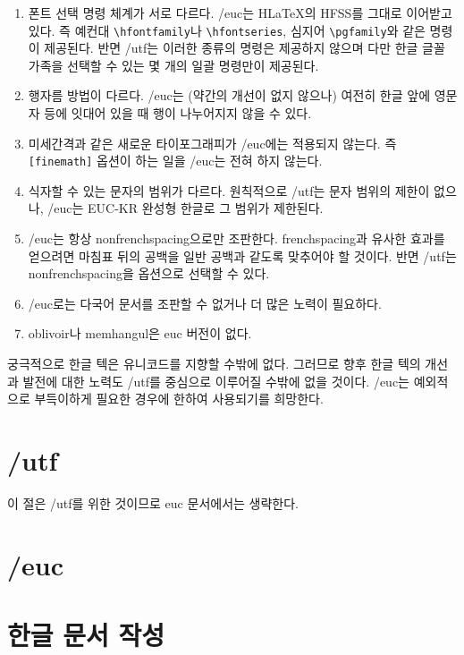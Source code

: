 \begin{enumerate}
\item 폰트 선택 명령 체계가 서로 다르다. \kotex/euc는 H\LaTeX 의
HFSS를 그대로 이어받고 있다. 즉 예컨대 \verb|\hfontfamily|나
\verb|\hfontseries|, 심지어 \verb|\pgfamily|와 같은 명령이
제공된다. 반면 \kotex/utf는 이러한 종류의 명령은 제공하지 않으며
다만 한글 글꼴 가족을 선택할 수 있는 몇 개의 일괄 명령만이 제공된다.

\item 행자름 방법이 다르다. \kotex/euc는 (약간의 개선이 없지 않으나)
여전히 한글 앞에 영문자 등에 잇대어 있을 때 행이 나누어지지 않을 수 있다.

\item 미세간격과 같은 새로운 타이포그래피가 \kotex/euc에는 적용되지
않는다. 즉 \texttt{[finemath]} 옵션이 하는 일을 \kotex/euc는 전혀
하지 않는다.

\item 식자할 수 있는 문자의 범위가 다르다. 원칙적으로 \kotex/utf는
문자 범위의 제한이 없으나, \kotex/euc는 EUC-KR 완성형 한글로 그 범위가
제한된다.

\item \kotex/euc는 항상 nonfrenchspacing으로만 조판한다. frenchspacing과
유사한 효과를 얻으려면 마침표 뒤의 공백을 일반 공백과 같도록 맞추어야 할 것이다. 반면
\kotex/utf는 nonfrenchspacing을 옵션으로 선택할 수 있다.

\item \kotex/euc로는 다국어 문서를 조판할 수 없거나 더 많은 노력이
필요하다.

\item oblivoir나 memhangul은 euc 버전이 없다.
\end{enumerate}

궁극적으로 한글 텍은 유니코드를 지향할 수밖에 없다. 그러므로 향후 한글 텍의
개선과 발전에 대한 노력도 \kotex/utf를 중심으로 이루어질 수밖에 없을 것이다.
\kotex/euc는 예외적으로 부득이하게 필요한 경우에 한하여 사용되기를 희망한다.


\part{\kotex/utf}

\ifEUCmode
이 절은 \kotex/utf를 위한 것이므로 euc 문서에서는 생략한다.
\else

\fi

\part{\kotex/euc}

\ifEUCmode

\else

\fi

\part{한글 문서 작성}

\ifEUCmode

\else

\fi

\ifEUCmode

\else

\fi

\printindex

\ifEUCmode

\else

\fi


